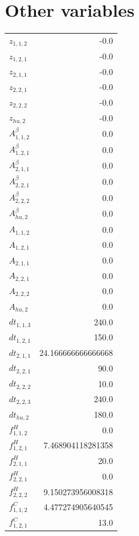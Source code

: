 \documentclass{article}%
\makeatletter
\let\mcnewpage=\newpage%
\newcommand{\TrickSupertabularIntoMulticols}{%
\renewcommand\newpage{%
\if@firstcolumn%
\hrule width\linewidth height0pt%
\columnbreak%
\else%
\mcnewpage%
\fi%
}%
}%
\makeatother
\begin{document}
\section{Other variables}%
\thispagestyle{plain}%
\begin{multicols*}{3}%
\TrickSupertabularIntoMulticols%
%
\begin{supertabular}{lr}%
	$z_{1,1,2}$ & -0.0 \\%
	$z_{1,2,1}$ & -0.0 \\%
	$z_{2,1,1}$ & -0.0 \\%
	$z_{2,2,1}$ & -0.0 \\%
	$z_{2,2,2}$ & -0.0 \\%
	$z_{hu,2}$ & -0.0 \\%
	$A_{1,1,2}^{\beta}$ & 0.0 \\%
	$A_{1,2,1}^{\beta}$ & 0.0 \\%
	$A_{2,1,1}^{\beta}$ & 0.0 \\%
	$A_{2,2,1}^{\beta}$ & 0.0 \\%
	$A_{2,2,2}^{\beta}$ & 0.0 \\%
	$A_{hu,2}^{\beta}$ & 0.0 \\%
	$A_{1,1,2}$ & 0.0 \\%
	$A_{1,2,1}$ & 0.0 \\%
	$A_{2,1,1}$ & 0.0 \\%
	$A_{2,2,1}$ & 0.0 \\%
	$A_{2,2,2}$ & 0.0 \\%
	$A_{hu,2}$ & 0.0 \\%
	$dt_{1,1,3}$ & 240.0 \\%
	$dt_{1,2,1}$ & 150.0 \\%
	$dt_{2,1,1}$ & 24.166666666666668 \\%
	$dt_{2,2,1}$ & 90.0 \\%
	$dt_{2,2,2}$ & 10.0 \\%
	$dt_{2,2,3}$ & 240.0 \\%
	$dt_{hu,2}$ & 180.0 \\%
	$f_{1,1,2}^{H}$ & 0.0 \\%
	$f_{1,2,1}^{H}$ & 7.468904118281358 \\%
	$f_{2,1,1}^{H}$ & 20.0 \\%
	$f_{2,2,1}^{H}$ & 0.0 \\%
	$f_{2,2,2}^{H}$ & 9.150273956008318 \\%
	$f_{1,1,2}^{C}$ & 4.477274905640545 \\%
	$f_{1,2,1}^{C}$ & 13.0 \\%

\end{supertabular}
\end{multicols*}
\end{document}
